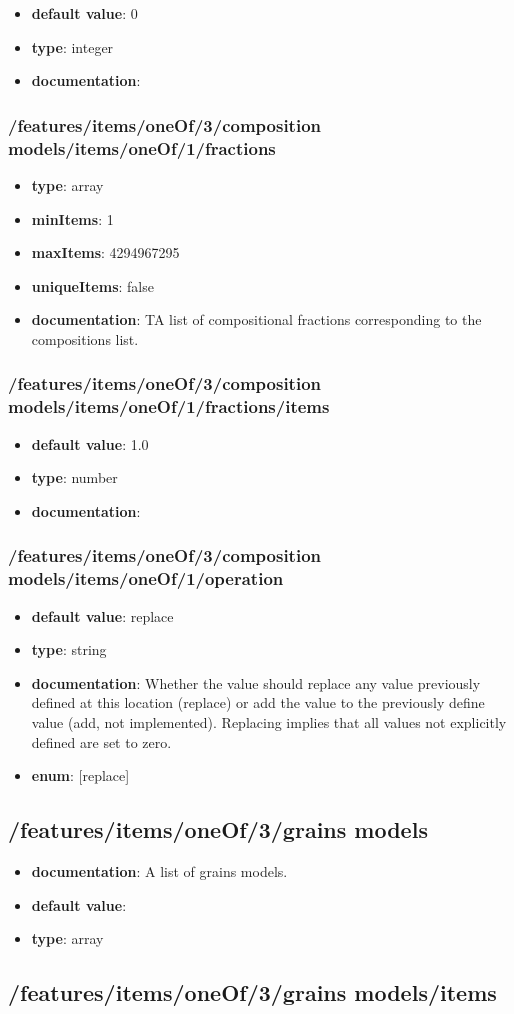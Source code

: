\begin{itemize}\item {\bf default value}: 0
\item {\bf type}: integer
\item {\bf documentation}: 
\end{itemize}\subsubsection{/features/items/oneOf/3/composition models/items/oneOf/1/fractions}
\begin{itemize}\item {\bf type}: array
\item {\bf minItems}: 1
\item {\bf maxItems}: 4294967295
\item {\bf uniqueItems}: false
\item {\bf documentation}: TA list of compositional fractions corresponding to the compositions list.
\end{itemize}\subsubsection{/features/items/oneOf/3/composition models/items/oneOf/1/fractions/items}
\begin{itemize}\item {\bf default value}: 1.0
\item {\bf type}: number
\item {\bf documentation}: 
\end{itemize}\subsubsection{/features/items/oneOf/3/composition models/items/oneOf/1/operation}
\begin{itemize}\item {\bf default value}: replace
\item {\bf type}: string
\item {\bf documentation}: Whether the value should replace any value previously defined at this location (replace) or add the value to the previously define value (add, not implemented). Replacing implies that all values not explicitly defined are set to zero.
\item {\bf enum}: [replace]\end{itemize}\subsection{/features/items/oneOf/3/grains models}
\begin{itemize}\item {\bf documentation}: A list of grains models.
\item {\bf default value}: 
\item {\bf type}: array
\end{itemize}\subsection{/features/items/oneOf/3/grains models/items}

